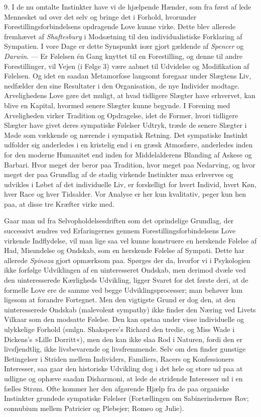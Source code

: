 \documentclass[12pt,a4paper,openany]{book}
\newcommand{\opage}[1]{\marginnote{\footnotesize\textit{[#1]}}}
\begin{document}
9. I de nu omtalte Instinkter have vi de hjælpende Hænder, som fra først
af lede Mennesket ud over det selv og bringe det i Forhold, hvorunder
Forestillingsforbindelsens opdragende Love kunne virke. Dette blev
allerede fremhævet af \emph{Shaftesbury} i Modsætning til den
individualistiske Forklaring af Sympatien. I vore Dage er dette
Synspunkt især gjort gældende af \emph{Spencer} og \emph{Darwin}. --- Er
Følelsen én Gang knyttet til en Forestilling, og denne til andre
Forestillinger, vil Vejen (i Følge 3) være aabnet til Udvidelse og
Modifikation af Følelsen. Og idet en saadan Metamorfose langsomt
foregaar under Slægtens Liv, nedfælder den sine Resultater i den
Organisation, de nye Individer modtage. Arvelighedens Love gøre det
muligt, at hvad tidligere Slægter have erhvervet, kan blive en Kapital,
hvormed senere Slægter kunne begynde. I Forening med Arveligheden virker
Tradition og Opdragelse, idet de Former, hvori tidligere Slægter have
givet deres sympatiske Følelser Udtryk, træde de senere Slægter i Møde
som vækkende og nærende i sympatisk Retning. Det sympatiske Instinkt
udfolder sig anderledes i en kristelig end i en græsk Atmosfære,
anderledes inden for den moderne Humanitet end inden for Middelalderens
Blanding af Askese og Barbari. Hvor meget der beror paa Tradition, hvor
meget paa Nedarving, og hvor meget der paa Grundlag af de stadig
virkende Instinkter maa erhverves og udvikles i Løbet af det
individuelle Liv, er forskelligt for hvert Individ, hvert Køn, hver Race
og hver Tidsalder. Vor Analyse er her kun kvalitativ, peger kun hen paa,
at disse tre Kræfter virke med.

Gaar man ud fra Selvopholdelsesdriften som det oprindelige Grundlag, der
successivt ændres ved Erfaringernes gennem Forestillingsforbindelsens
Love virkende Indflydelse, vil man lige saa vel kunne konstruere en
herskende Følelse af Had,
\opage{303}Misundelse og Ondskab, som en herskende Følelse af Sympati.
Dette har allerede \emph{Spinoza} gjort opmærksom paa. Spørges der da,
hvorfor vi i Psykologien ikke forfølge Udviklingen af en uinteresseret
Ondskab, men derimod dvæle ved den uinteresserede Kærligheds Udvikling,
ligger Svaret for det første deri, at de formelle Love ere de samme ved
begge Udviklingsprocesser; man behøver kun ligesom at forandre
Fortegnet. Men den vigtigste Grund er dog den, at den uinteresserede
Ondskab (malevolent sympathy) ikke finder den Næring ved Livets Vilkaar
som den modsatte Følelse. Den kan opstaa under visse individuelle og
ulykkelige Forhold (smlgn. Shakspere’s Richard den tredie, og Miss Wade
i Dickens’s »Lille Dorritt«), men den kan ikke slaa Rod i Naturen, fordi
den er livsfjendtlig, ikke livsbevarende og livsfremmende. Selv om den
finder gunstige Betingelser i Striden mellem Individers, Familiers,
Racers og Konfessioners Interesser, saa gaar den historiske Udvikling
dog i det hele og store ud paa at udligne og ophæve saadan Disharmoni,
at lede de stridende Interesser ud i en fælles Strøm. Ofte kommer her
den afgørende Hjælp fra de paa organiske Instinkter grundede sympatiske
Følelser (Fortællingen om Sabinerindernes Rov; connubium mellem
Patricier og Plebejer; Romeo og Julie).
\end{document}
